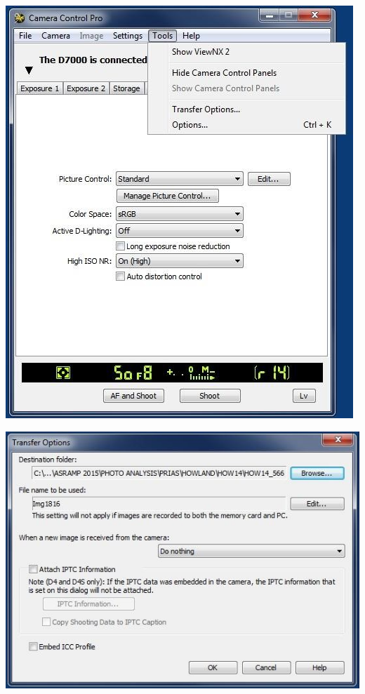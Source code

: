 \documentclass[]{book}
\begin{document}
\includegraphics{images/Camera16.jpg}

\includegraphics{images/Camera17.jpg}
\end{document}
